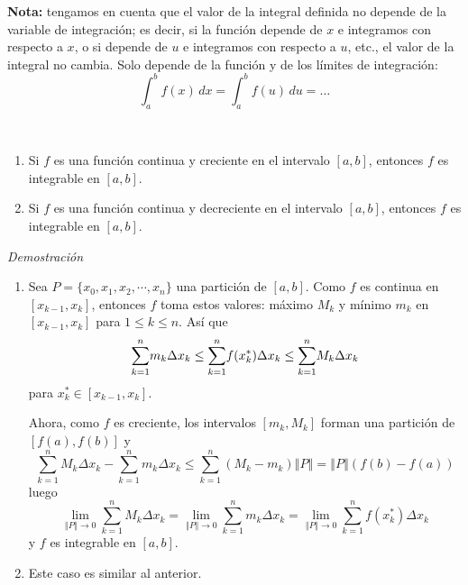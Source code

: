 
{\scriptsize
\textbf{Nota:} tengamos en cuenta que el valor de la integral
definida no depende de la variable de integración; es decir, si la función depende de $x$ e integramos con respecto a $x$, o si depende de $u$ e integramos con respecto a $u$, etc., el valor de la integral no cambia. Solo depende de la función y de los límites de integración:
\[
\int_a^bf(x)\,dx=\int_a^b f(u)\, du=\ldots
\]
}

\begin{teorema}
\leavevmode\\[-1.2ex] %
\renewcommand{\labelenumi}{\textup{\theenumi.}}
\begin{enumerate}[leftmargin=1.2em,   itemindent=0pt,       labelwidth=\labelwidth,labelsep=0.5em,]
 \item \textnormal{Si \textit{$f$} es una función continua y creciente en el intervalo \textit{$[a,b]$}, entonces \textit{$f$} es integrable en \textit{$[a,b].$}}
 \item \textnormal{Si \textit{$f$} es una función continua y decreciente en el intervalo \textit{$[a,b]$}, entonces \textit{$f$} es integrable en \textit{$[a,b].$}}
\end{enumerate}
\end{teorema}


\textit{Demostración}

\begin{enumerate}[leftmargin=1.2em,   itemindent=0pt,       labelwidth=\labelwidth,labelsep=0.5em,]
\item Sea $P=\{x_{0},x_{1},x_{2},\cdots ,x_{n}\}$ una partición de $[a,b].$ Como $f$ es continua en $[x_{k-1},x_{k}]$, entonces $f$ toma estos valores: máximo $M_{k}$ y mínimo $m_{k}$ en $[x_{k-1},x_{k}]$ para $1\leq k\leq n$. Así que
{\small
\[
\overset{n}{\underset{k=1}{\sum }}m_{k}\Delta x_{k}\leq \overset{n}{%
\underset{k=1}{\sum }}f(x_{k}^{\ast })\Delta x_{k}\leq \overset{n}{%
\underset{k=1}{\sum }}M_{k}\Delta x_{k}
\]
}
para $x_{k}^{\ast }\in [x_{k-1},x_{k}]$.

Ahora, como $f$ es creciente, los intervalos $[m_{k},M_{k}]$ forman una
partición de $[f(a),f(b)]$ y
{\small
\[
\overset{n}{\underset{k=1}{\sum }}M_{k}\Delta x_{k}-\overset{n}{\underset{k=1}{\sum }}m_{k}\Delta x_{k}\leq \overset{n}{\underset{k=1}{\sum }}\left( M_{k}-m_{k}\right) \left\Vert P\right\Vert =\left\Vert P\right\Vert
(f(b)-f(a))
\]
}
luego
{\small
\[
\underset{\left\Vert P\right\Vert \rightarrow 0}{\lim }\overset{n}{\underset{k=1}{\sum }}M_{k}\Delta x_{k}=\underset{\left\Vert P\right\Vert\rightarrow 0}{\lim }\overset{n}{\underset{k=1}{\sum }}m_{k}\Delta x_{k}=\underset{\left\Vert P\right\Vert \rightarrow 0}{\lim }\overset{n}{\underset{k=1}{\sum }}f(x_{k}^{\ast })\Delta x_{k}
\]
}
y $f$ es integrable en $[a,b]$.

\item Este caso es similar al anterior. 
\end{enumerate}


